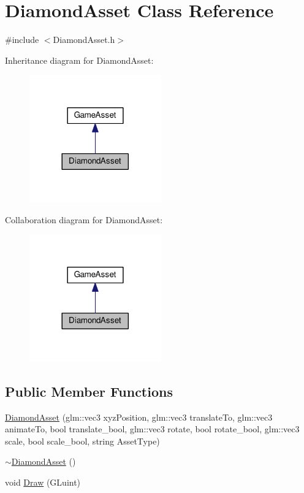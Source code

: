 \hypertarget{class_diamond_asset}{}\section{Diamond\+Asset Class Reference}
\label{class_diamond_asset}


{\ttfamily \#include $<$Diamond\+Asset.\+h$>$}



Inheritance diagram for Diamond\+Asset\+:\nopagebreak
\begin{figure}[H]
\begin{center}
\leavevmode
\includegraphics[width=161pt]{class_diamond_asset__inherit__graph}
\end{center}
\end{figure}


Collaboration diagram for Diamond\+Asset\+:\nopagebreak
\begin{figure}[H]
\begin{center}
\leavevmode
\includegraphics[width=161pt]{class_diamond_asset__coll__graph}
\end{center}
\end{figure}
\subsection*{Public Member Functions}
\begin{DoxyCompactItemize}
\item 
\hyperlink{class_diamond_asset_a297efbf3312ce0efba79f055a076481c}{Diamond\+Asset} (glm\+::vec3 xyz\+Position, glm\+::vec3 translate\+To, glm\+::vec3 animate\+To, bool translate\+\_\+bool, glm\+::vec3 rotate, bool rotate\+\_\+bool, glm\+::vec3 scale, bool scale\+\_\+bool, string Asset\+Type)
\item 
\hyperlink{class_diamond_asset_a1b7bf6ba76651a9304943f2c41fe36b8}{$\sim$\+Diamond\+Asset} ()
\item 
void \hyperlink{class_diamond_asset_a0c259031894623285b3b511321c73abb}{Draw} (G\+Luint)
\end{DoxyCompactItemize}


